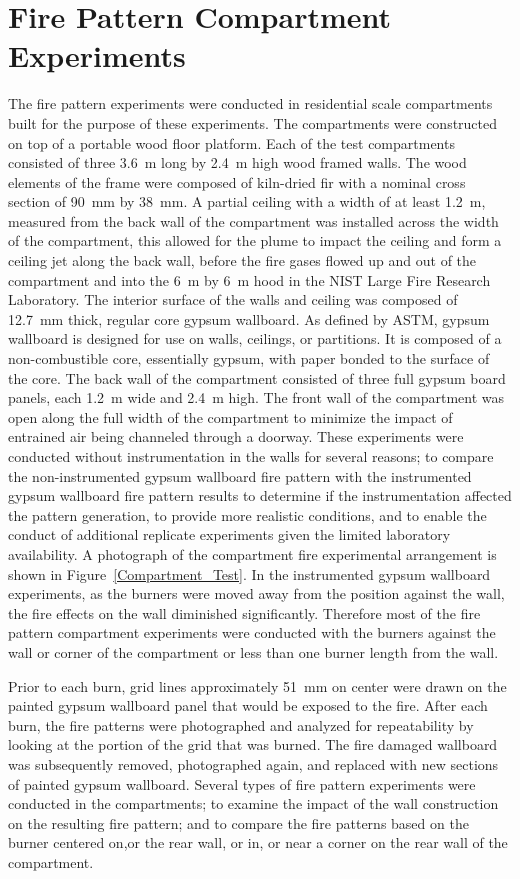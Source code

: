 \documentclass[twoside]{uocthesis}
\begin{document}
\chapter{Fire Pattern Compartment Experiments}

The fire pattern experiments were conducted in residential scale compartments built for the purpose of these experiments.  The compartments were constructed on top of a portable wood floor platform.  Each of the test compartments consisted of three 3.6~m long by 2.4~m high wood framed walls. The wood elements of the frame were composed of kiln-dried fir with a nominal cross section of 90~mm by 38~mm.  A partial ceiling with a width of at least 1.2~m, measured from the back wall of the compartment was installed across the width of the compartment, this allowed for the plume to impact the ceiling and form a ceiling jet along the back wall, before the fire gases flowed up and out of the compartment and into the 6~m by 6~m hood in the NIST Large Fire Research Laboratory. The interior surface of the walls and ceiling was composed of 12.7~mm thick, regular core gypsum wallboard. As defined by ASTM, gypsum wallboard is designed for use on walls, ceilings, or partitions.  It is composed of a non-combustible core, essentially gypsum, with paper bonded to the surface of the core. The back wall of the compartment consisted of three full gypsum board panels, each 1.2~m wide and 2.4~m high.  The front wall of the compartment was open along the full width of the compartment to minimize the impact of entrained air being channeled through a doorway. These experiments were conducted without instrumentation in the walls for several reasons; to compare the non-instrumented gypsum wallboard fire pattern with the instrumented gypsum wallboard fire pattern results to determine if the instrumentation affected the pattern generation, to provide more realistic conditions, and to enable the conduct of additional replicate experiments given the limited laboratory availability. A photograph of the compartment fire experimental arrangement is shown in Figure~\ref{Compartment_Test}. In the instrumented gypsum wallboard experiments, as the burners were moved away from the position against the wall, the fire effects on the wall diminished significantly.  Therefore most of the fire pattern compartment experiments were conducted with the burners against the wall or corner of the compartment or less than one burner length from the wall.

Prior to each burn, grid lines approximately 51~mm on center were drawn on the painted gypsum wallboard panel that would be exposed to the fire.  After each burn, the fire patterns were photographed and analyzed for repeatability by looking at the portion of the grid that was burned. The fire damaged wallboard was subsequently removed, photographed again, and replaced with new sections of painted gypsum wallboard. Several types of fire pattern experiments were conducted in the compartments; to examine the impact of the wall construction on the resulting fire pattern; and to compare the fire patterns based on the burner centered on,or the rear wall, or in, or near a corner on the rear wall of the compartment.
\end{document}
